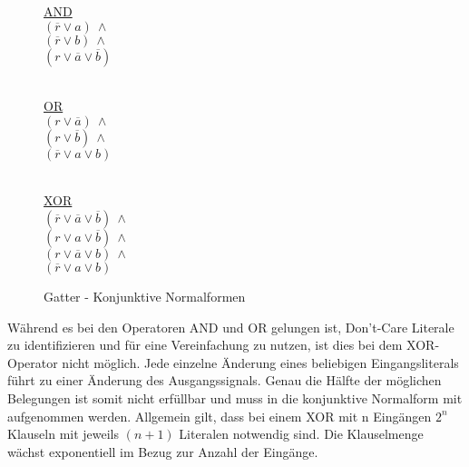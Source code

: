 \begin{figure}[!h]
  \centering
  \begin{minipage}[l]{4.65cm}
    \underline{AND}\\
    $ (\overline{r} \vee a) ~ \wedge $\\
    $ (\overline{r} \vee b) ~ \wedge $\\
    $ (r \vee \overline{a} \vee \overline{b}) $\\
    ~
  \end{minipage}
  \begin{minipage}[l]{4.65cm}
    \underline{OR}\\
    $ (r \vee \overline{a}) ~ \wedge $\\
    $ (r \vee \overline{b}) ~ \wedge $\\
    $ (\overline{r} \vee a \vee b) $\\
    ~
  \end{minipage}
  \begin{minipage}[l]{4.3cm}
    \underline{XOR}\\
    $ (\overline{r} \vee \overline{a} \vee \overline{b}) ~ \wedge $\\
    $ (r \vee a \vee \overline{b}) ~ \wedge $\\
    $ (r \vee \overline{a} \vee b) ~ \wedge $\\
    $ (\overline{r} \vee a \vee b) $
  \end{minipage}
  \caption{Gatter - Konjunktive Normalformen}
  \label{fig:gatter_cnf}
\end{figure}

Während es bei den Operatoren AND und OR gelungen ist, Don't-Care Literale zu identifizieren und für eine Vereinfachung zu nutzen, ist dies bei dem XOR-Operator
nicht möglich. Jede einzelne Änderung eines beliebigen Eingangsliterals führt zu einer Änderung des Ausgangssignals. Genau die Hälfte der möglichen Belegungen
ist somit nicht erfüllbar und muss in die konjunktive Normalform mit aufgenommen werden. Allgemein gilt, dass bei einem XOR mit n Eingängen $ 2^{n} $ Klauseln
mit jeweils $ (n + 1) $ Literalen notwendig sind. Die Klauselmenge wächst exponentiell im Bezug zur Anzahl der Eingänge.

